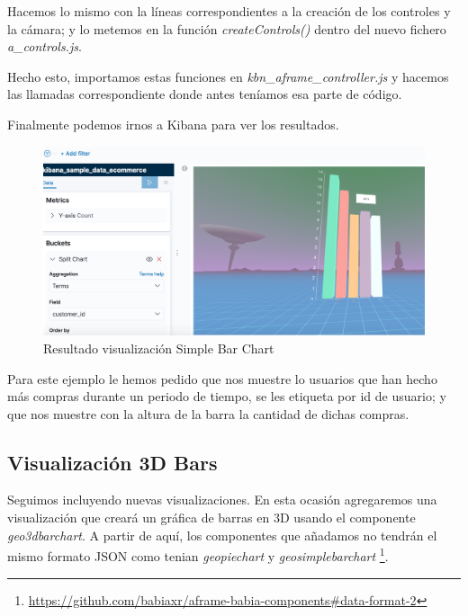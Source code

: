 \documentclass[a4paper, 12pt]{book}
\begin{document}


Hacemos lo mismo con la líneas correspondientes a la creación de los controles y la cámara; y lo metemos en la función \textit{createControls()} dentro del nuevo fichero \textit{a\_controls.js}.



Hecho esto, importamos estas funciones en \textit{kbn\_aframe\_controller.js} y hacemos las llamadas correspondiente donde antes teníamos esa parte de código.



Finalmente podemos irnos a Kibana para ver los resultados.

\begin{figure}[H]
  \centering
  \includegraphics[width=12cm, keepaspectratio]{img/development/barchart.png}
  \caption{Resultado visualización Simple Bar Chart}
  \label{fig:simplebarchart}
\end{figure}

Para este ejemplo le hemos pedido que nos muestre lo usuarios que han hecho más compras durante un periodo de tiempo, se les etiqueta por id de usuario; y que nos muestre con la altura de la barra la cantidad de dichas compras.

\subsection{Visualización 3D Bars}
\label{sec:3dbars}

Seguimos incluyendo nuevas visualizaciones. En esta ocasión agregaremos una visualización que creará un gráfica de barras en 3D usando el componente \textit{geo3dbarchart}. A partir de aquí, los componentes que añadamos no tendrán el mismo formato JSON como tenian \textit{geopiechart} y \textit{geosimplebarchart} \footnote{\url{https://github.com/babiaxr/aframe-babia-components#data-format-2}}.
\end{document}
